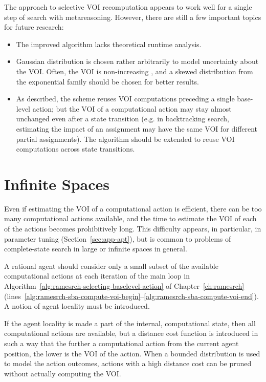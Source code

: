 The approach to selective VOI recomputation appears to work well for a
single step of search with metareasoning. However, there are still a
few important topics for future research:

\begin{itemize}
\item The improved algorithm lacks theoretical runtime analysis.
\item Gaussian distribution is chosen rather arbitrarily to model
uncertainty about the VOI. Often, the VOI is non-increasing
\cite{Guestrin.submodular}, and a skewed distribution from
the exponential family should be chosen for better results.
\item As described, the scheme reuses VOI computations preceding a
single base-level action; but the VOI of a computational action may
stay almost unchanged even after a state transition (e.g. in
backtracking search, estimating the impact of an assignment may have
the same VOI for different partial assignments). The algorithm should
be extended to reuse VOI computations across state transitions.
\end{itemize}

\section{Infinite Spaces}
\label{sec:raticomp-infinite-spaces}

Even if estimating the VOI of a computational action is efficient,
there can be too many computational actions available, and the time to
estimate the VOI of each of the actions becomes prohibitively
long. This difficulty appears, in particular, in parameter tuning
(Section~\ref{sec:app-apt}), but is common to problems of
complete-state search in large or infinite spaces in general.

A rational agent should consider only a small subset of the available
computational actions at each iteration of the main loop in
Algorithm~\ref{alg:ramesrch-selecting-baselevel-action} of
Chapter~\ref{ch:ramesrch} (lines~\ref{alg:ramesrch-sba-compute-voi-begin}--\ref{alg:ramesrch-sba-compute-voi-end}).
A notion of agent locality must be introduced.

If the agent locality is made a part of the internal, computational
state, then all computational actions are available, but a distance
cost function is introduced in such a way that the further a
computational action from the current agent position, the lower is the
VOI of the action. When a bounded distribution is used to model the
action outcomes, actions with a high distance cost can be pruned
without actually computing the VOI.

